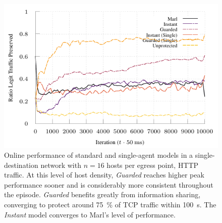 \documentclass[10pt, times, comsoc]{IEEEtran}
\begin{document}
\begin{figure}
	\centering
	\vspace{-0.8cm}
	\includegraphics[width=0.75\linewidth]{../plots/tnsm-tcp-16-single}
	\vspace{-0.35cm}
	\caption{
		Online performance of standard and single-agent models in a single-destination network with $n=16$ hosts per egress point, HTTP traffic.
		At this level of host density, \emph{Guarded} reaches higher peak performance sooner and is considerably more consistent throughout the episode.
		\emph{Guarded} benefits greatly from information sharing, converging to protect around \SI{75}{\percent} of TCP traffic within \SI{100}{\second}.
		The \emph{Instant} model converges to Marl's level of performance.
		\label{fig:tcp-tree-16}
	}
\end{figure}

%	

%	

%	
\end{document}
